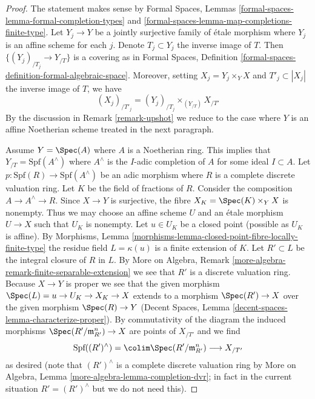 \begin{proof}
The statement makes sense by
Formal Spaces, Lemmas \ref{formal-spaces-lemma-formal-completion-types} and
\ref{formal-spaces-lemma-map-completions-finite-type}.
Let $Y_j \to Y$ be a jointly surjective family of \'etale morphism
where $Y_j$ is an affine scheme for each $j$.
Denote $T_j \subset Y_j$ the inverse image of $T$.
Then $\{(Y_j)_{/T_j} \to Y_{/T}\}$ is a covering as in
Formal Spaces, Definition \ref{formal-spaces-definition-formal-algebraic-space}.
Moreover, setting $X_j = Y_j \times_Y X$ and $T'_j \subset |X_j|$
the inverse image of $T$, we have
$$
(X_j)_{/T'_j} = (Y_j)_{/T_j} \times_{(Y_{/T})} X_{/T'}
$$
By the discussion in Remark \ref{remark-upshot} we reduce to the case where
$Y$ is an affine Noetherian scheme treated in the next paragraph.

\medskip\noindent
Assume $Y = \Spec(A)$ where $A$ is a Noetherian ring. This implies that
$Y_{/T} = \text{Spf}(A^\wedge)$ where $A^\wedge$ is the $I$-adic completion
of $A$ for some ideal $I \subset A$. Let
$p : \text{Spf}(R) \to \text{Spf}(A^\wedge)$
be an adic morphism where $R$ is a complete discrete valuation ring.
Let $K$ be the field of fractions of $R$.
Consider the composition $A \to A^\wedge \to R$.
Since $X \to Y$ is surjective, the fibre $X_K = \Spec(K) \times_Y X$
is nonempty. Thus we may choose an affine scheme $U$ and an \'etale
morphism $U \to X$ such that $U_K$ is nonempty.
Let $u \in U_K$ be a closed point (possible as $U_K$ is affine). By
Morphisms, Lemma \ref{morphisms-lemma-closed-point-fibre-locally-finite-type}
the residue field $L = \kappa(u)$ is a finite extension of $K$. Let
$R' \subset L$ be the integral closure of $R$ in $L$. By
More on Algebra, Remark \ref{more-algebra-remark-finite-separable-extension}
we see that $R'$ is a discrete valuation ring.
Because $X \to Y$ is proper we see that the given morphism
$\Spec(L) = u \to U_K \to X_K \to X$ extends to a morphism
$\Spec(R') \to X$ over the given morphism $\Spec(R) \to Y$
(Decent Spaces,
Lemma \ref{decent-spaces-lemma-characterize-proper}).
By commutativity of the diagram the induced morphisms
$\Spec(R'/\mathfrak m_{R'}^n) \to X$ are points of $X_{/T'}$
and we find
$$
\text{Spf}((R')^\wedge) = \colim \Spec(R'/\mathfrak m_{R'}^n)
\longrightarrow X_{/T'}
$$
as desired (note that $(R')^\wedge$ is a complete discrete valuation ring
by More on Algebra, Lemma \ref{more-algebra-lemma-completion-dvr};
in fact in the current situation $R' = (R')^\wedge$ but we do not
need this).
\end{proof}


